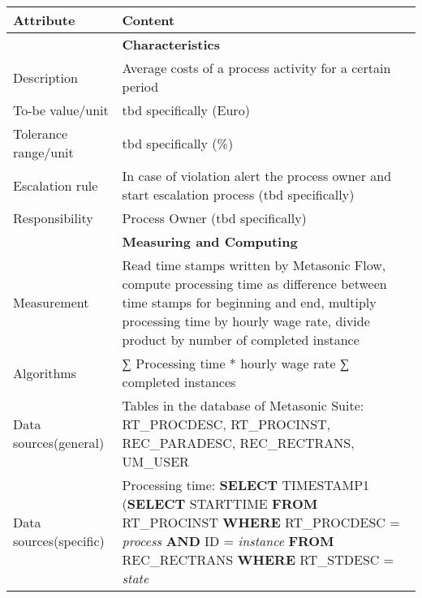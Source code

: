 \begin{table}[htbp]
	\centering
	\begin{tabular}{|p{3.0 cm } |p{10.0 cm }|}
		\hline
		\textbf{Attribute} & \textbf{Content}\\
		\hline
		\hline
		& \textbf{Characteristics}\\
		\hline
		Description & Average costs of a process activity for a certain period\\
		\hline
		To-be value/unit & tbd specifically (Euro)\\
		\hline
		Tolerance range/unit & tbd specifically (\%)\\
		\hline
		Escalation rule & In case of violation alert the process owner and start escalation process (tbd specifically)\\
		\hline
		Responsibility & Process Owner (tbd specifically)\\
		\hline
		\hline
		& \textbf{Measuring and Computing}\\
		\hline
		Measurement & Read time stamps written by Metasonic Flow, compute processing time as difference between time stamps for beginning and end, multiply processing time by hourly wage rate, divide product by number of completed instance\\
		\hline
		Algorithms & ∑ Processing time * hourly wage rate
					∑ completed instances\\
		\hline
		Data sources(general) & Tables in the database of Metasonic Suite:\newline
		RT\_PROCDESC, RT\_PROCINST, REC\_PARADESC, REC\_RECTRANS, UM\_USER\\
		\hline
		Data sources(specific) & Processing time:\newline
		\hspace*{4mm} \textbf{SELECT} TIMESTAMP1 \newline
		\hspace*{10mm} (\textbf{SELECT} STARTTIME \newline
		\hspace*{10mm} \textbf{FROM} RT\_PROCINST \newline
		\hspace*{10mm} \textbf{WHERE} RT\_PROCDESC = \textit{process} \newline
		\hspace*{10mm} \textbf{AND} ID = \textit{instance} \newline
		\hspace*{4mm}\textbf{FROM} REC\_RECTRANS \newline
		\hspace*{4mm}\textbf{WHERE} RT\_STDESC = \textit{state} \newline

\end{tabular}
\end{table}
